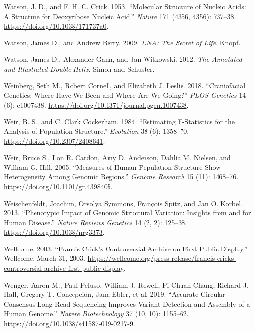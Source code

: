 \documentclass[
]{book}
\newlength{\cslhangindent}
\newlength{\cslentryspacingunit} %
\newenvironment{CSLReferences}[2] %
 {%
  \setlength{\parindent}{0pt}
  \ifodd #1
  \let\oldpar\par
  \def\par{\hangindent=\cslhangindent\oldpar}
  \fi
  \setlength{\parskip}{#2\cslentryspacingunit}
 }%
 {}
\begin{document}
\begin{CSLReferences}{1}{0}
\leavevmode{}%
Watson, J. D., and F. H. C. Crick. 1953. {``Molecular {Structure} of {Nucleic Acids}: {A Structure} for {Deoxyribose Nucleic Acid}.''} \emph{Nature} 171 (4356, 4356): 737--38. \url{https://doi.org/10.1038/171737a0}.

\leavevmode{}%
Watson, James D., and Andrew Berry. 2009. \emph{{DNA}: {The} Secret of Life}. {Knopf}.

\leavevmode{}%
Watson, James D., Alexander Gann, and Jan Witkowski. 2012. \emph{The Annotated and Illustrated Double Helix}. {Simon and Schuster}.

\leavevmode{}%
Weinberg, Seth M., Robert Cornell, and Elizabeth J. Leslie. 2018. {``Craniofacial Genetics: {Where} Have We Been and Where Are We Going?''} \emph{PLOS Genetics} 14 (6): e1007438. \url{https://doi.org/10.1371/journal.pgen.1007438}.

\leavevmode{}%
Weir, B. S., and C. Clark Cockerham. 1984. {``Estimating {F-Statistics} for the {Analysis} of {Population Structure}.''} \emph{Evolution} 38 (6): 1358--70. \url{https://doi.org/10.2307/2408641}.

\leavevmode{}%
Weir, Bruce S., Lon R. Cardon, Amy D. Anderson, Dahlia M. Nielsen, and William G. Hill. 2005. {``Measures of Human Population Structure Show Heterogeneity Among Genomic Regions.''} \emph{Genome Research} 15 (11): 1468--76. \url{https://doi.org/10.1101/gr.4398405}.

\leavevmode{}%
Weischenfeldt, Joachim, Orsolya Symmons, François Spitz, and Jan O. Korbel. 2013. {``Phenotypic Impact of Genomic Structural Variation: Insights from and for Human Disease.''} \emph{Nature Reviews Genetics} 14 (2, 2): 125--38. \url{https://doi.org/10.1038/nrg3373}.

\leavevmode{}%
Wellcome. 2003. {``Francis {Crick}'s Controversial Archive on First Public Display.''} {Wellcome}. March 31, 2003. \url{https://wellcome.org/press-release/francis-cricks-controversial-archive-first-public-display}.

\leavevmode{}%
Wenger, Aaron M., Paul Peluso, William J. Rowell, Pi-Chuan Chang, Richard J. Hall, Gregory T. Concepcion, Jana Ebler, et al. 2019. {``Accurate Circular Consensus Long-Read Sequencing Improves Variant Detection and Assembly of a Human Genome.''} \emph{Nature Biotechnology} 37 (10, 10): 1155--62. \url{https://doi.org/10.1038/s41587-019-0217-9}.


\end{CSLReferences}
\end{document}
